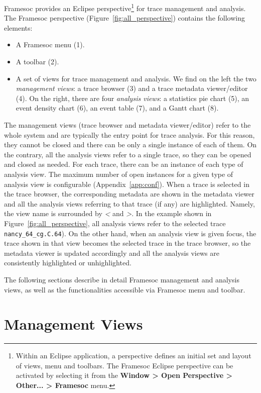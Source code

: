 \documentclass[twoside]{article}
\begin{document}
\begin{sloppypar}
Framesoc provides an Eclipse perspective\footnote{Within an Eclipse application, a perspective defines an initial set and layout of views, menu and toolbars. The Framesoc Eclipse perspective can be activated by selecting it from the \textbf{Window > Open Perspective > Other... > Framesoc} menu.} for trace management and analysis.
The Framesoc perspective (Figure~\ref{fig:all_perspective}) contains the following elements:
\begin{itemize}
 \item A Framesoc menu (\num{1}).
 \item A toolbar (\num{2}).
 \item A set of views for trace management and analysis. We find on the left the two \emph{management views}: a trace browser (\num{3}) and a trace metadata viewer/editor (\num{4}). On the right, there are four \emph{analysis views}: a statistics pie chart (\num{5}), an event density chart (\num{6}), an event table (\num{7}), and a Gantt chart (\num{8}). 
\end{itemize}

The management views (trace browser and metadata viewer/editor) refer to the whole system and are typically the entry point for trace analysis.
For this reason, they cannot be closed and there can be only a single instance of each of them.
On the contrary, all the analysis views refer to a single trace, so they can be opened and closed as needed. 
For each trace, there can be an instance of each type of analysis view. 
The maximum number of open instances for a given type of analysis view is configurable (Appendix~\ref{app:conf}).
When a trace is selected in the trace browser, the corresponding metadata are shown in the metadata viewer and all the analysis views referring to that trace (if any) are highlighted. Namely, the view name is surrounded by \emph{<} and \emph{>}. 
In the example shown in Figure~\ref{fig:all_perspective}, all analysis views refer to the selected trace \texttt{nancy\_64\_cg.C.64}).
On the other hand, when an analysis view is given focus, the trace shown in that view becomes the selected trace in the trace browser, so the metadata viewer is updated accordingly and all the analysis views are consistently highlighted or unhighlighted. 

The following sections describe in detail Framesoc management and analysis views, as well as the functionalities accessible via Framesoc menu and toolbar.

\section{Management Views}
\label{sec:management}


\end{sloppypar}
\end{document}
